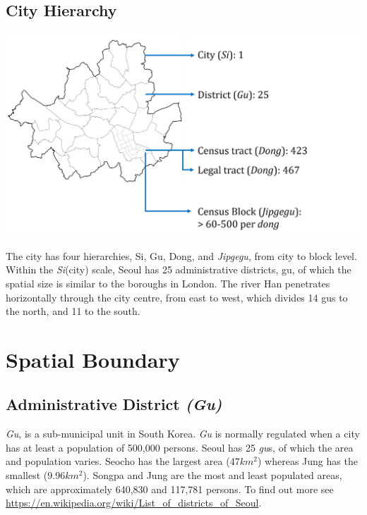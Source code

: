 \documentclass[]{book}
\begin{document}
\section{City Hierarchy}\label{city-hierarchy}

\begin{center}\includegraphics[width=16.82in]{images/02_boundary} \end{center}

The city has four hierarchies, Si, Gu, Dong, and \emph{Jipgegu}, from
city to block level. Within the \emph{Si}(city) scale, Seoul has 25
administrative districts, gu, of which the spatial size is similar to
the boroughs in London. The river Han penetrates horizontally through
the city centre, from east to west, which divides 14 gus to the north,
and 11 to the south.

\chapter{Spatial Boundary}\label{spatial-boundary}

\section{\texorpdfstring{Administrative District
\emph{(Gu)}}{Administrative District (Gu)}}\label{administrative-district-gu}

\emph{Gu}, is a sub-municipal unit in South Korea. \emph{Gu} is normally
regulated when a city has at least a population of 500,000 persons.
Seoul has 25 \emph{gu}s, of which the area and population varies. Seocho
has the largest area (47\(km^2\)) whereas Jung has the smallest
(9.96\(km^2\)). Songpa and Jung are the most and least populated areas,
which are approximately 640,830 and 117,781 persons. To find out more
see \url{https://en.wikipedia.org/wiki/List_of_districts_of_Seoul}.
\end{document}
